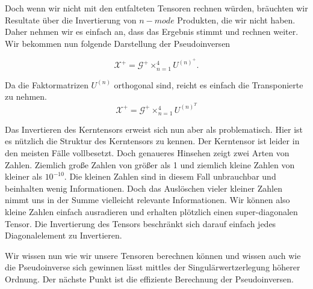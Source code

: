Doch wenn wir nicht mit den entfalteten Tensoren rechnen würden, bräuchten wir Resultate über die Invertierung von $n-mode$ Produkten, die wir nicht haben. Daher nehmen wir es einfach an, dass das Ergebnis stimmt und rechnen weiter. Wir bekommen nun folgende Darstellung der Pseudoinversen

\begin{equation} \label{eq:pinv}
\pmb{\mathscr{X}}^{+} = \pmb{\mathscr{G}}^{+} \times_{n=1}^{4} U^{ (n) ^{+} }.
\end{equation}

Da die Faktormatrizen $U^{(n)}$ orthogonal sind, reicht es einfach die Transponierte zu nehmen. 
\begin{equation}
\pmb{\mathscr{X}}^+ = \pmb{\mathscr{G}}^{+} \times_{n=1}^{4} U^{ (n) ^{T} }
\end{equation}

Das Invertieren des Kerntensors erweist sich nun aber als problematisch.
Hier ist es nützlich die Struktur des Kerntensors zu kennen. Der Kerntensor ist leider in den meisten Fälle vollbesetzt. Doch genaueres Hinsehen zeigt zwei Arten von Zahlen. Ziemlich große Zahlen von größer als 1 und ziemlich kleine Zahlen von kleiner als $10^{-10}$. 
Die kleinen Zahlen sind in diesem Fall unbrauchbar und beinhalten wenig Informationen. Doch das Auslöschen vieler kleiner Zahlen nimmt uns in der Summe vielleicht relevante Informationen.
Wir können also kleine Zahlen einfach ausradieren und erhalten plötzlich einen super-diagonalen Tensor. Die Invertierung des Tensors beschränkt sich darauf einfach jedes Diagonalelement zu Invertieren.

Wir wissen nun wie wir unsere Tensoren berechnen können und wissen auch wie die Pseudoinverse sich gewinnen lässt mittles der Singulärwertzerlegung höherer Ordnung.
Der nächste Punkt ist die effiziente Berechnung der Pseudoinversen.



